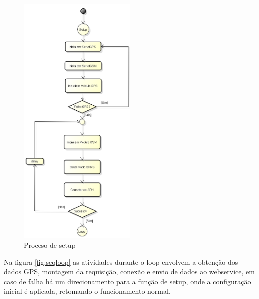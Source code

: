 \begin{figure}[!h]
	\centering
	\includegraphics[width=0.5\textwidth]{figures/ModuloVeicular_Boot.png}
	\caption{Proceso de setup}
	\label{fig:seqsetup}
\end{figure}

\newpage
Na figura \ref{fig:seqloop} as atividades durante o loop envolvem a obtenção dos dados GPS, montagem da requisição, conexão e envio de dados ao webservice, em caso de falha há um direcionamento para a função de setup, onde a configuração inicial é aplicada, retomando o funcionamento normal.

